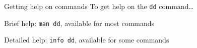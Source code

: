 \begin{block}{Getting help on commands}
  To get help on the \texttt{dd} command\ldots \\[0.5ex]
  \begin{indented_itemize}
  \item Brief help: \texttt{man dd}, available for most commands
  \item Detailed help: \texttt{info dd}, available for some commands
  \end{indented_itemize}
\end{block}
